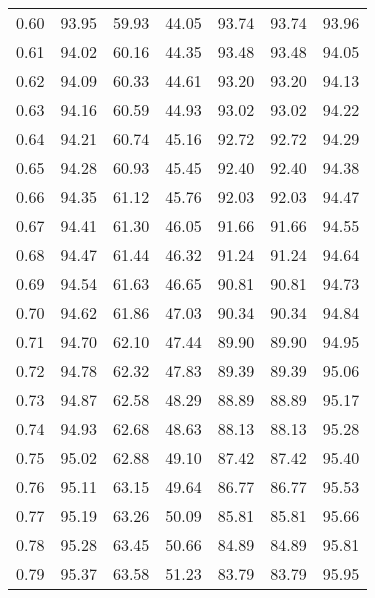\begin{tabular}{|c|c|c|c|c|c|c|}
      0.60 &     93.95 &     59.93 &      44.05 &   93.74 &      93.74 &         93.96 \\
      0.61 &     94.02 &     60.16 &      44.35 &   93.48 &      93.48 &         94.05 \\
      0.62 &     94.09 &     60.33 &      44.61 &   93.20 &      93.20 &         94.13 \\
      0.63 &     94.16 &     60.59 &      44.93 &   93.02 &      93.02 &         94.22 \\
      0.64 &     94.21 &     60.74 &      45.16 &   92.72 &      92.72 &         94.29 \\
      0.65 &     94.28 &     60.93 &      45.45 &   92.40 &      92.40 &         94.38 \\
      0.66 &     94.35 &     61.12 &      45.76 &   92.03 &      92.03 &         94.47 \\
      0.67 &     94.41 &     61.30 &      46.05 &   91.66 &      91.66 &         94.55 \\
      0.68 &     94.47 &     61.44 &      46.32 &   91.24 &      91.24 &         94.64 \\
      0.69 &     94.54 &     61.63 &      46.65 &   90.81 &      90.81 &         94.73 \\
      0.70 &     94.62 &     61.86 &      47.03 &   90.34 &      90.34 &         94.84 \\
      0.71 &     94.70 &     62.10 &      47.44 &   89.90 &      89.90 &         94.95 \\
      0.72 &     94.78 &     62.32 &      47.83 &   89.39 &      89.39 &         95.06 \\
      0.73 &     94.87 &     62.58 &      48.29 &   88.89 &      88.89 &         95.17 \\
      0.74 &     94.93 &     62.68 &      48.63 &   88.13 &      88.13 &         95.28 \\
      0.75 &     95.02 &     62.88 &      49.10 &   87.42 &      87.42 &         95.40 \\
      0.76 &     95.11 &     63.15 &      49.64 &   86.77 &      86.77 &         95.53 \\
      0.77 &     95.19 &     63.26 &      50.09 &   85.81 &      85.81 &         95.66 \\
      0.78 &     95.28 &     63.45 &      50.66 &   84.89 &      84.89 &         95.81 \\
      0.79 &     95.37 &     63.58 &      51.23 &   83.79 &      83.79 &         95.95 \\

\end{tabular}
